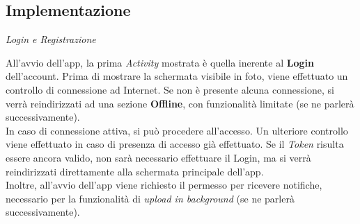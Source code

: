 \documentclass{article}
\begin{document}
\subsection*{Implementazione}
\large
\textit{Login e Registrazione}\\
\begin{minipage}[t]{0.6\textwidth}
    \raggedright
    \vspace*{10pt}
    All'avvio dell'app, la prima \textit{Activity} mostrata è quella inerente al \textbf{Login} dell'account. Prima di mostrare la schermata visibile in foto, viene effettuato un controllo di connessione ad Internet. Se non è presente alcuna connessione, si verrà reindirizzati ad una sezione \textbf{Offline}, con funzionalità limitate (se ne parlerà successivamente).\\
    In caso di connessione attiva, si può procedere all'accesso. Un ulteriore controllo viene effettuato in caso di presenza di accesso già effettuato. Se il \textit{Token} risulta essere ancora valido, non sarà necessario effettuare il Login, ma si verrà reindirizzati direttamente alla schermata principale dell'app.\\
    Inoltre, all'avvio dell'app viene richiesto il permesso per ricevere notifiche, necessario per la funzionalità di \textit{upload in background} (se ne parlerà successivamente).
\end{minipage}
\hfill
\end{document}
